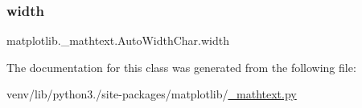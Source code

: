 \subsubsection{\texorpdfstring{width}{width}}
{\footnotesize\ttfamily matplotlib.\+\_\+mathtext.\+Auto\+Width\+Char.\+width}



The documentation for this class was generated from the following file\+:\begin{DoxyCompactItemize}
\item 
venv/lib/python3./site-\/packages/matplotlib/\hyperlink{__mathtext_8py}{\+\_\+mathtext.\+py}\end{DoxyCompactItemize}
